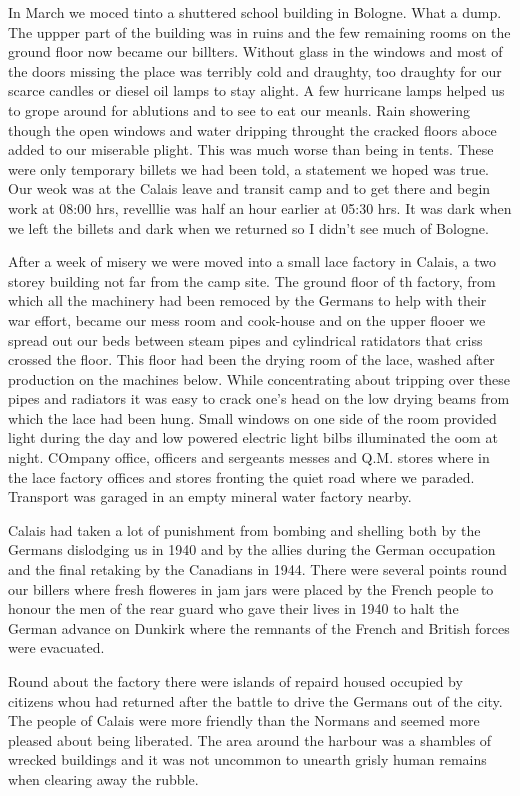 
In March we moced tinto a shuttered school building in Bologne. What a
dump. The uppper part of the building was in ruins and the few
remaining rooms on the ground floor now became our billters. Without
glass in the windows and most of the doors missing the place was
terribly cold and draughty, too draughty for our scarce candles or
diesel oil lamps to stay alight. A few hurricane lamps helped us to
grope around for ablutions and to see to eat our meanls. Rain
showering though the open windows and water dripping throught the
cracked floors aboce added to our miserable plight. This was much
worse than being in tents. These were only temporary billets we had
been told, a statement we hoped was true. Our weok was at the Calais
leave and transit camp and to get there and begin work at 08:00 hrs,
revelllie was half an hour earlier at 05:30 hrs. It was dark when we
left the billets and dark when we returned so I didn't see much of
Bologne.

After a week of misery we were moved into a small lace factory in
Calais, a two storey building not far from the camp site. The ground
floor of th factory, from which all the machinery had been remoced by
the Germans to help with their war effort, became our mess room and
cook-house and on the upper flooer we spread out our beds between
steam pipes and cylindrical ratidators that criss crossed the
floor. This floor had been the drying room of the lace, washed after
production on the machines below. While concentrating about tripping
over these pipes and radiators it was easy to crack one's head on the
low drying beams from which the lace had been hung. Small windows on
one side of the room provided light during the day and low powered
electric light bilbs illuminated the oom at night. COmpany office,
officers and sergeants messes and Q.M. stores where in the lace
factory offices and stores fronting the quiet road where we
paraded. Transport was garaged in an empty mineral water factory
nearby.

Calais had taken a lot of punishment from bombing and shelling both by
the Germans dislodging us in 1940 and by the allies during the German
occupation and the final retaking by the Canadians in 1944. There were
several points round our billers where fresh floweres in jam jars were
placed by the French people to honour the men of the rear guard who
gave their lives in 1940 to halt the German advance on Dunkirk where
the remnants of the French and British forces were evacuated.

Round about the factory there were islands of repaird housed occupied
by citizens whou had returned after the battle to drive the Germans
out of the city. The people of Calais were more friendly than the
Normans and seemed more pleased about being liberated. The area around
the harbour was a shambles of wrecked buildings and it was not
uncommon to unearth grisly human remains when clearing away the
rubble.

